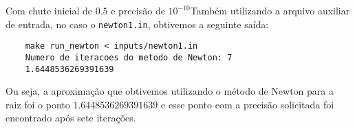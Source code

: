 Com chute inicial de \(0.5\) e precisão de \(10^{-10}\)Também utilizando a
arquivo auxiliar de entrada, no caso o \texttt{newton1.in}, obtivemos a seguinte
saída:

\begin{verbatim}
	make run_newton < inputs/newton1.in
	Numero de iteracoes do metodo de Newton: 7
	1.6448536269391639
\end{verbatim}

Ou seja, a aproximação que obtivemos utilizando o método de Newton para a raiz
foi o ponto \(1.6448536269391639\) e esse ponto com a precisão solicitada foi
encontrado após sete iterações.
